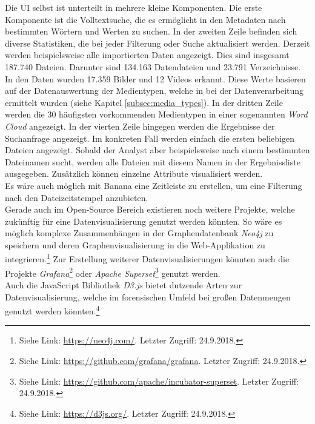 \noindent
Die UI selbst ist unterteilt in mehrere kleine Komponenten. Die erste Komponente ist die Volltextsuche, die es ermöglicht in den Metadaten nach bestimmten Wörtern und Werten zu suchen. In der zweiten Zeile befinden sich diverse Statistiken, die bei jeder Filterung oder Suche aktualisiert werden. Derzeit werden beispielsweise alle importierten Daten angezeigt. Dies sind insgesamt 187.740 Dateien. Darunter sind 134.163 Datendateien und 23.791 Verzeichnisse. In den Daten wurden 17.359 Bilder und 12 Videos erkannt. Diese Werte basieren auf der Datenauswertung der Medientypen, welche in bei der Datenverarbeitung ermittelt wurden (siehe Kapitel \ref{subsec:media_types}).
In der dritten Zeile werden die 30 häufigsten vorkommenden Medientypen in einer sogenannten \textit{Word Cloud} angezeigt. In der vierten Zeile hingegen werden die Ergebnisse der Suchanfrage angezeigt. Im konkreten Fall werden einfach die ersten beliebigen Dateien angezeigt. Sobald der Analyst aber beispielsweise nach einem bestimmten Dateinamen sucht, werden alle Dateien mit diesem Namen in der Ergebnissliste ausgegeben. Zusätzlich können einzelne Attribute visualisiert werden.\\
Es wäre auch möglich mit Banana eine Zeitleiste zu erstellen, um eine Filterung nach den Dateizeitstempel anzubieten.\\

\noindent
Gerade auch im Open-Source Bereich existieren noch weitere Projekte, welche zukünftig für eine Datenvisualisierung genutzt werden könnten. So wäre es möglich komplexe Zusammenhängen in der Graphendatenbank \textit{Neo4j} zu speichern und deren Graphenvisualisierung in die Web-Applikation zu integrieren.\footnote{Siehe Link: \url{https://neo4j.com/}. Letzter Zugriff: 24.9.2018.} Zur Erstellung weiterer Datenvisualisierungen könnten auch die Projekte \textit{Grafana}\footnote{Siehe Link: \url{https://github.com/grafana/grafana}. Letzter Zugriff: 24.9.2018.} oder \textit{Apache Superset}\footnote{Siehe Link: \url{https://github.com/apache/incubator-superset}. Letzter Zugriff: 24.9.2018.} genutzt werden.\\
Auch die JavaScript Bibliothek \textit{D3.js} bietet dutzende Arten zur Datenvisualisierung, welche im forensischen Umfeld bei großen Datenmengen genutzt werden könnten.\footnote{Siehe Link: \url{https://d3js.org/}. Letzter Zugriff: 24.9.2018.}\\



